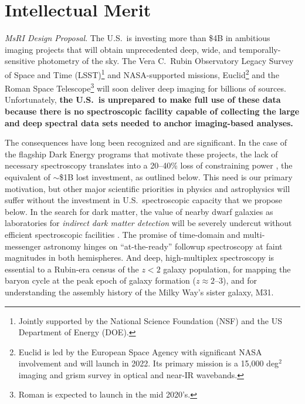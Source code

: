 \documentclass[oneside,11pt]{amsart}
\begin{document}


\setcounter{page}{1}


\section{Intellectual Merit}

\noindent \emph{MsRI Design Proposal}. The U.S.\ is investing more than \$4B in ambitious imaging projects that will obtain unprecedented deep, wide, and temporally-sensitive photometry of the sky.  The Vera C.~Rubin Observatory Legacy Survey of Space and Time (LSST)\footnote{Jointly supported by the National Science Foundation (NSF) and the US Department of Energy (DOE).} and NASA-supported missions, Euclid\footnote{Euclid is led by the European Space Agency with significant NASA involvement and will launch in 2022. Its primary mission is a 15,000 deg$^2$ imaging and grism survey in optical and near-IR wavebands.} and the Roman Space Telescope\footnote{Roman is expected to launch in the mid 2020's.} will soon deliver deep imaging for billions of sources.  Unfortunately, \textbf{the U.S.\ is unprepared to make full use of these data because there is no spectroscopic facility capable of collecting the large and deep spectral data sets needed to anchor imaging-based analyses.}

The consequences have long been recognized \citep[e.g.,][]{NAP21722} and are significant.  In the case of the flagship
Dark Energy programs that motivate these projects, the lack of necessary spectroscopy translates into a 20--40\% loss
of constraining power \citep{newman15}, the equivalent of $\sim$\$1B lost investment, as outlined below.  This need is our primary
motivation, but other major scientific priorities in physics and astrophysics will suffer without the investment in
U.S.\ spectroscopic capacity that we propose below.  In the search for dark matter, the value of nearby dwarf galaxies
as laboratories for \emph{indirect dark matter detection} will be severely undercut without efficient spectroscopic
facilities \citep[e.g.,][]{simon19}.  The promise of time-domain and multi-messenger astronomy hinges on
``at-the-ready'' followup spectroscopy at faint magnitudes in both hemispheres.  And deep, high-multiplex spectroscopy
is essential to a Rubin-era census of the $z < 2$ galaxy population, for mapping the baryon cycle at the peak epoch of
galaxy formation ($z \approx 2$--3), and for understanding the assembly history of the Milky Way's sister galaxy, M31.
\end{document}
